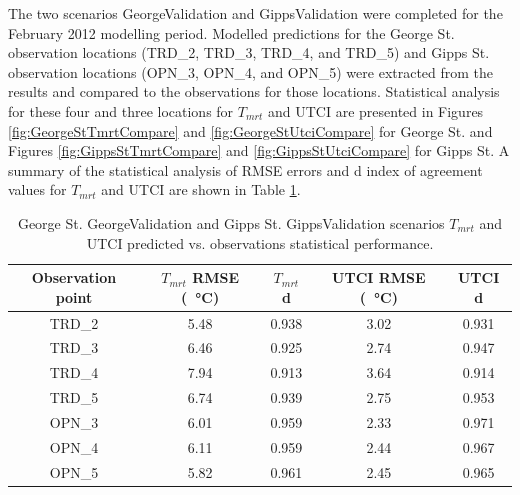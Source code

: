 \documentclass[final,3p,times,authoryear]{elsarticle}
\begin{document}




The two scenarios GeorgeValidation and GippsValidation were completed for the February 2012 modelling period. Modelled predictions for the George St. observation locations (TRD\_2, TRD\_3, TRD\_4, and TRD\_5) and Gipps St. observation locations (OPN\_3, OPN\_4, and OPN\_5) were extracted from the results and compared to the observations for those locations. Statistical analysis for these four and three locations for $T_{mrt}$ and UTCI are presented in Figures \ref{fig:GeorgeStTmrtCompare} and \ref{fig:GeorgeStUtciCompare} for George St. and Figures \ref{fig:GippsStTmrtCompare} and \ref{fig:GippsStUtciCompare} for Gipps St. A summary of the statistical analysis of RMSE errors and d index of agreement values for $T_{mrt}$ and UTCI are shown in Table \ref{tab:georgetmrt}. 

\begin{center}
\begin{table}[!htbp]
\caption{George St. GeorgeValidation and Gipps St. GippsValidation scenarios $T_{mrt}$ and UTCI predicted vs. observations statistical performance.\label{tab:georgetmrt}}
  \begin{tabular}{  | c |c |c  | c | c | } 
	\hline \textbf{Observation point} & \textbf{$T_{mrt}$ RMSE (\SI{}{\degreeCelsius})} & \textbf{$T_{mrt}$ d} & \textbf{UTCI RMSE (\SI{}{\degreeCelsius})} & \textbf{UTCI d}\\ \hline
TRD\_2  &  5.48   & 0.938  & 3.02  & 0.931   \\ \hline
TRD\_3   & 6.46   & 0.925  & 2.74  & 0.947   \\ \hline
TRD\_4   & 7.94   & 0.913  & 3.64  & 0.914  \\ \hline
TRD\_5   & 6.74   & 0.939  & 2.75  & 0.953   \\ \hline
OPN\_3   & 6.01   & 0.959  & 2.33  & 0.971   \\ \hline
OPN\_4  &  6.11   & 0.959  & 2.44  & 0.967   \\ \hline
OPN\_5   & 5.82   & 0.961  & 2.45  & 0.965  \\ \hline
  \end{tabular} 
\end{table}
\end{center} 
\end{document}
